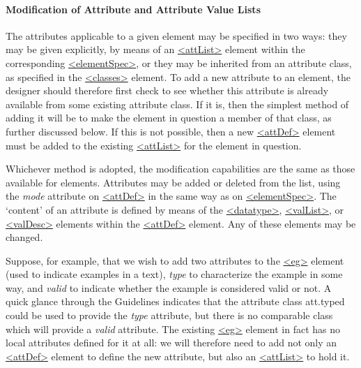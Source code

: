 \paragraph[{Modification of Attribute and Attribute Value Lists}]{Modification of Attribute and Attribute Value Lists}\label{MDMDAL}\par
The attributes applicable to a given element may be specified in two ways: they may be given explicitly, by means of an \hyperref[TEI.attList]{<attList>} element within the corresponding \hyperref[TEI.elementSpec]{<elementSpec>}, or they may be inherited from an attribute class, as specified in the \hyperref[TEI.classes]{<classes>} element. To add a new attribute to an element, the designer should therefore first check to see whether this attribute is already available from some existing attribute class. If it is, then the simplest method of adding it will be to make the element in question a member of that class, as further discussed below. If this is not possible, then a new \hyperref[TEI.attDef]{<attDef>} element must be added to the existing \hyperref[TEI.attList]{<attList>} for the element in question.\par
Whichever method is adopted, the modification capabilities are the same as those available for elements. Attributes may be added or deleted from the list, using the {\itshape mode} attribute on \hyperref[TEI.attDef]{<attDef>} in the same way as on \hyperref[TEI.elementSpec]{<elementSpec>}. The ‘content’ of an attribute is defined by means of the \hyperref[TEI.datatype]{<datatype>}, \hyperref[TEI.valList]{<valList>}, or \hyperref[TEI.valDesc]{<valDesc>} elements within the \hyperref[TEI.attDef]{<attDef>} element. Any of these elements may be changed.\par
Suppose, for example, that we wish to add two attributes to the \hyperref[TEI.eg]{<eg>} element (used to indicate examples in a text), {\itshape type} to characterize the example in some way, and {\itshape valid} to indicate whether the example is considered valid or not. A quick glance through the Guidelines indicates that the attribute class \textsf{att.typed} could be used to provide the {\itshape type} attribute, but there is no comparable class which will provide a {\itshape valid} attribute. The existing \hyperref[TEI.eg]{<eg>} element in fact has no local attributes defined for it at all: we will therefore need to add not only an \hyperref[TEI.attDef]{<attDef>} element to define the new attribute, but also an \hyperref[TEI.attList]{<attList>} to hold it.\par
